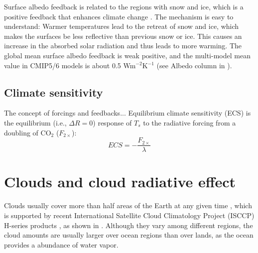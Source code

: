 Surface albedo feedback is related to the regions with snow and ice, which is a positive feedback that enhances climate change \citep{Winton2006surface,Goosse2018}. The mechanism is easy to understand: Warmer temperatures lead to the retreat of snow and ice, which makes the surfaces be less reflective than previous snow or ice. This causes an increase in the absorbed solar radiation and thus leads to more warming. The global mean surface albedo feedback is weak positive, and the multi-model mean value in CMIP5/6 models is about 0.5 Wm$^{-2}$K$^{-1}$ (see Albedo column in ).

\subsection{Climate sensitivity}
The concept of forcings and feedbacks...
Equilibrium climate sensitivity (ECS) is the equilibrium (i.e., $\Delta R=0$) response of $T_s$ to the radiative forcing from a doubling of CO$_2$ ($F_{2\times}$):
\begin{equation}
    ECS = -\frac{F_{2\times}}{\lambda}
    \label{eq:ecs}
\end{equation}


\section{Clouds and cloud radiative effect}

Clouds usually cover more than half areas of the Earth at any given time \citep{Houze2014,Ramanathan1989}, which is supported by recent International Satellite Cloud Climatology Project (ISCCP) H-series products \citep{Young2018}, as shown in . Although they vary among different regions, the cloud amounts are usually larger over ocean regions than over lands, as the ocean provides a abundance of water vapor.

